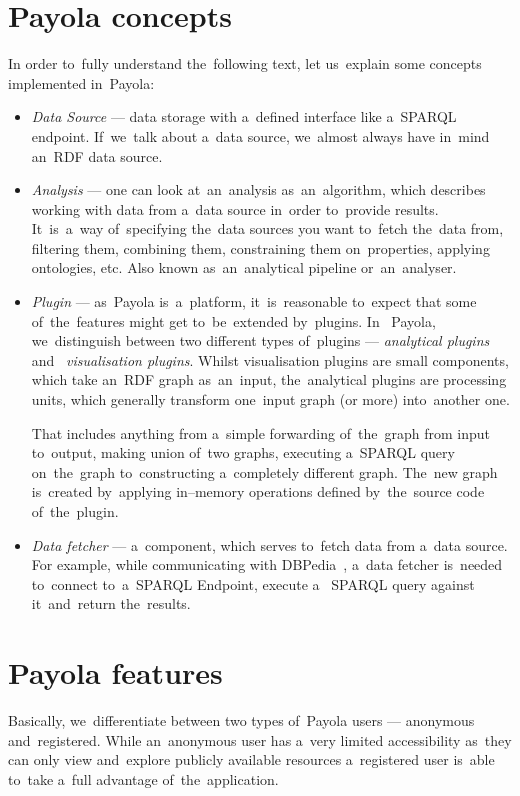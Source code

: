 \section{Payola concepts}
In order to~fully understand the~following text, let us~explain some concepts 
implemented in~Payola:
\begin{itemize}
  \item \emph{Data Source} --- data storage with a~defined interface like a~SPARQL endpoint.
  If~we~talk about a~data source, we~almost always have in~mind an~RDF data source.
  
  \item \emph{Analysis} --- one can look at~an~analysis as~an~algorithm, which 
  describes working with data from a~data source in~order to~provide results. 
  It~is~a~way of~specifying the~data sources you want to~fetch the~data from, 
  filtering them, combining them, constraining them on~properties, applying 
  ontologies, etc. Also known as~an~analytical pipeline or~an~analyser.  
  
  \item \emph{Plugin} --- as~Payola is~a~platform, it~is~reasonable to~expect that 
  some of~the~features might get to~be~extended by~plugins. In~  Payola, we~distinguish between two different types of~plugins --- \emph{analytical plugins} and~  \emph{visualisation plugins}. Whilst visualisation plugins are small components, 
  which take an~RDF graph as~an~input, the~analytical plugins are processing 
  units, which generally transform one~input graph (or more) into~another one.
  
  That includes anything from a~simple forwarding of~the~graph from input to~output, 
  making union of~two graphs, executing a~SPARQL query on~the~graph to~constructing 
  a~completely different graph. The~new graph is~created by~applying in--memory
  operations defined by~the~source code of~the~plugin.
  
  \item \emph{Data fetcher} --- a~component, which serves to~fetch data from a~data 
  source. For example, while communicating with DBPedia~\cite{dbpedia},
  a~data fetcher is~needed to~connect to~a~SPARQL Endpoint, execute a~  SPARQL query against it~and~return the~results.
\end{itemize}

\section{Payola features}
Basically, we~differentiate between two types of~Payola users --- anonymous and~registered. 
While an~anonymous user has a~very limited accessibility as~they can only 
view and~explore publicly available resources a~registered user is~able to~take a~full advantage of~the~application.


